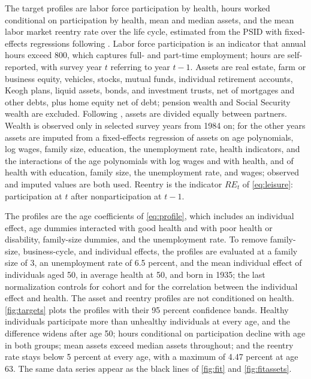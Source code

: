 The target profiles are labor force participation by health, hours worked conditional on participation by health, mean and median assets, and the mean labor market reentry rate over the life cycle, estimated from the PSID with fixed-effects regressions following \citet{french2005effects}. %
Labor force participation is an indicator that annual hours exceed 800, which captures full- and part-time employment; hours are self-reported, with survey year $t$ referring to year $t-1$. %
Assets are real estate, farm or business equity, vehicles, stocks, mutual funds, individual retirement accounts, Keogh plans, liquid assets, bonds, and investment trusts, net of mortgages and other debts, plus home equity net of debt; pension wealth and Social Security wealth are excluded. %
Following \citet{Borella2018}, assets are divided equally between partners. %
Wealth is observed only in selected survey years from 1984 on; for the other years assets are imputed from a fixed-effects regression of assets on age polynomials, log wages, family size, education, the unemployment rate, health indicators, and the interactions of the age polynomials with log wages and with health, and of health with education, family size, the unemployment rate, and wages; observed and imputed values are both used. %
Reentry is the indicator $RE_t$ of \eqref{eq:leisure}: participation at $t$ after nonparticipation at $t-1$.

The profiles are the age coefficients of \eqref{eq:profile}, which includes an individual effect, age dummies interacted with good health and with poor health or disability, family-size dummies, and the unemployment rate. %
To remove family-size, business-cycle, and individual effects, the profiles are evaluated at a family size of 3, an unemployment rate of 6.5 percent, and the mean individual effect of individuals aged 50, in average health at 50, and born in 1935; the last normalization controls for cohort and for the correlation between the individual effect and health. %
The asset and reentry profiles are not conditioned on health. %
\autoref{fig:targets} plots the profiles with their 95 percent confidence bands. Healthy individuals participate more than unhealthy individuals at every age, and the difference widens after age 50; hours conditional on participation decline with age in both groups; mean assets exceed median assets throughout; and the reentry rate stays below 5 percent at every age, with a maximum of 4.47 percent at age 63. %
The same data series appear as the black lines of \autoref{fig:fit} and \autoref{fig:fitassets}.

